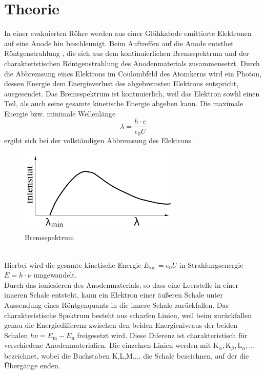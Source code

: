\section{Theorie}
\label{sec:Theorie}
In einer evakuierten Röhre werden aus einer Glühkatode emittierte Elektronen auf eine Anode hin beschleunigt.
Beim Auftreffen auf die Anode entsthet Röntgenstrahlung , die sich aus dem kontinuierlichen Bremsspektrum
und der charakteristischen Röntgenstrahlung des Anodenmaterials zusammensetzt.
Durch die Abbremsung eines Elektrons im Coulombfeld des Atomkerns wird ein Photon,
dessen Energie dem Energieverlust des abgebremsten Elektrons entspricht,
ausgesendet.
Das Bremsspektrum ist kontnuierlich, weil das Elektron sowhl einen Teil, als auch seine gesamte kinetische Energie abgeben kann.
Die maximale Energie bzw. minimale Wellenlänge
\begin{equation}
    \lambda = \frac{h \cdot c}{e_0 U}
    \label{eqn:gl1}
\end{equation}
ergibt sich bei der vollständigen Abbremsung des Elektrons.
\begin{figure}
    \centering
    \includegraphics[height=4.0cm]{data/abb1.jpg}
    \caption{Bremsspektrum \cite{V602}}
    \label{fig:abb1}
\end{figure} \\
\noindent
Hierbei wird die gesamte kinetische Energie $E_{\text{kin}} = e_0 U$ in Strahlungsenergie $E = h \cdot \nu$ umgewandelt.\\
\noindent
Durch das ioniesieren des Anodenmaterials, so dass eine Leerstelle in einer inneren Schale entsteht, kann ein Elektron einer äußeren Schale unter Aussendung eines Röntgenquants in die innere Schale zurückfallen.
Das charakteristische Spektrum besteht aus scharfen Linien, weil beim zurückfallen genau die Energiedifferenz zwischen den beiden Energieniveaus der beiden Schalen $h \nu = E_{\text{m}} - E_{\text{n}}$ freigesetzt wird.
Diese Diferenz ist charakteristisch für verschiedene Anodenmaterialien.
Die einzelnen Linien werden mit $\text{K}_{\alpha}, \text{K}_{\beta}, \text{L}_{\alpha},...$ bezeichnet, wobei die Buchstaben K,L,M,... die Schale bezeichnen, auf der die Übergänge enden.
